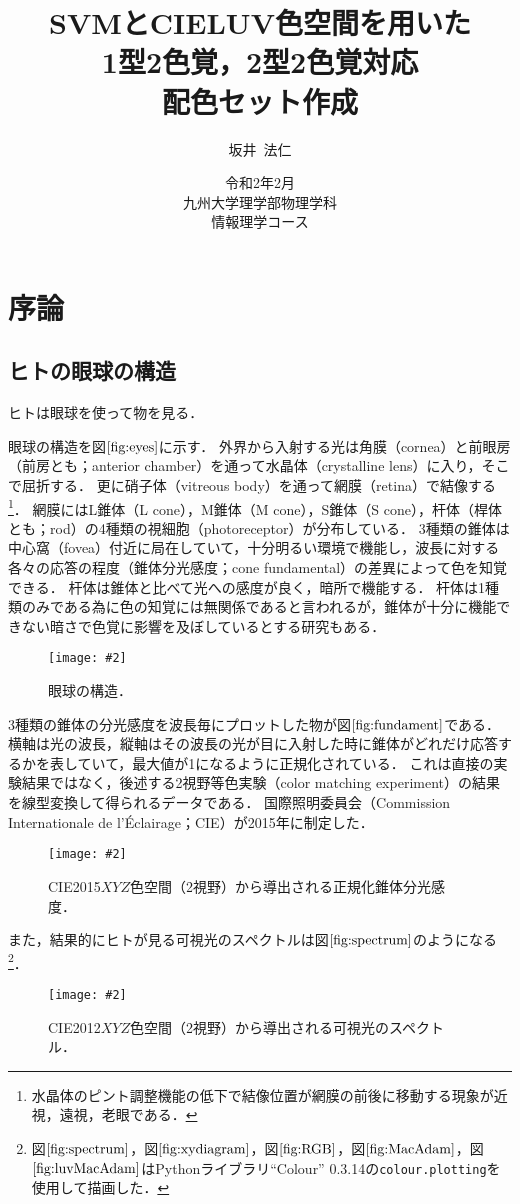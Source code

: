 \documentclass[uplatex,paper=a4,fontsize=4.0truemm,jafontsize=4.0truemm,head_space=30.0truemm,foot_space=30.0truemm,baselineskip=8.0truemm,line_length=40zw,gutter=25.0truemm,oneside,openany,fleqn,hanging_panctuation,open_bracket_pos=nibu_tentsuki,dvipdfmx,jis2004,book,titlepage]{jlreq}
\title{\vspace{-25truemm}\Huge{SVMとCIELUV色空間を用いた\\1型2色覚，2型2色覚対応\\配色セット作成}\vspace{55truemm}}
\author{\huge{坂井~法仁}}
\date{\LARGE{令和2年2月}\\ \vspace{30truemm}\LARGE{九州大学理学部物理学科\\ 情報理学コース}}
\theoremstyle{mystyle}
\newcommand{\captiondot}[1]{\caption{#1．}}
\newcommand{\figureinput}[4]{\begin{figure}[btp]\centering\texttt{[image: \#2]}\captiondot{#3}\label{fig:#4}\end{figure}}
\newcommand{\mathdisplaystyle}[1]{\(\displaystyle{#1}\)}
\newcommand{\Reference}[1]{\mathdisplaystyle{\ref{#1}}}
\begin{document}
	\maketitle
	\tableofcontents
	\clearpage
	\setcounter{page}{1}
	\chapter{序論}\label{chap:intro}
		\section{ヒトの眼球の構造}
			ヒトは眼球を使って物を見る．

			眼球の構造を図\Reference{fig:eyes}に示す．
			外界から入射する光は角膜（cornea）と前眼房（前房とも；anterior chamber）を通って水晶体（crystalline lens）に入り，そこで屈折する．
			更に硝子体（vitreous body）を通って網膜（retina）で結像する\footnote{水晶体のピント調整機能の低下で結像位置が網膜の前後に移動する現象が近視，遠視，老眼である．}．
			網膜にはL錐体（L cone），M錐体（M cone），S錐体（S cone），杆体（桿体とも；rod）の4種類の視細胞（photoreceptor）が分布している．
			3種類の錐体は中心窩（fovea）付近に局在していて，十分明るい環境で機能し，波長に対する各々の応答の程度（錐体分光感度；cone fundamental）の差異によって色を知覚できる．
			杆体は錐体と比べて光への感度が良く，暗所で機能する\cite{Hosoki2014}．
			杆体は1種類のみである為に色の知覚には無関係であると言われるが，錐体が十分に機能できない暗さで色覚に影響を及ぼしているとする研究もある\cite{Takeshita2014}．
			\figureinput{width=9.5truecm}{D:/a/figs/eye2.png}{眼球の構造\protect\cite[図-1]{Sotoyama1985}}{eyes}

			3種類の錐体の分光感度を波長毎にプロットした物が図\Reference{fig:fundament}である．
			横軸は光の波長，縦軸はその波長の光が目に入射した時に錐体がどれだけ応答するかを表していて，最大値が1になるように正規化されている．
			これは直接の実験結果ではなく，後述する2\textdegree 視野等色実験（color matching experiment）の結果を線型変換して得られるデータである．
			国際照明委員会（Commission Internationale de l'Éclairage；CIE）が2015年に制定した．
			\figureinput{width=\linewidth}{D:/a/figs/ConeFundamental.png}{CIE2015\mathdisplaystyle{XYZ}色空間（2\textdegree 視野）から導出される正規化錐体分光感度}{fundament}
			また，結果的にヒトが見る可視光のスペクトルは図\Reference{fig:spectrum}のようになる\footnote{図\Reference{fig:spectrum}，図\Reference{fig:xydiagram}，図\Reference{fig:RGB}，図\Reference{fig:MacAdam}，図\Reference{fig:luvMacAdam}はPythonライブラリ``Colour'' 0.3.14の\texttt{colour{.}plotting}を使用して描画した．}．
			\figureinput{width=10truecm}{D:/a/figs/spectrum.png}{CIE2012\mathdisplaystyle{XYZ}色空間（2\textdegree 視野）から導出される可視光のスペクトル}{spectrum}
\end{document}
